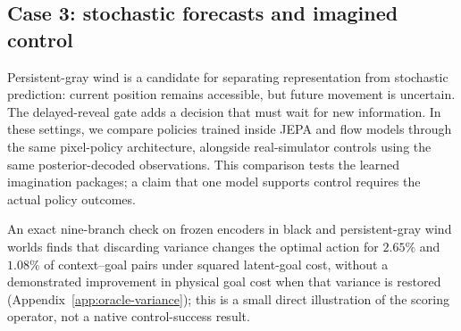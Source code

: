 \subsection{Case 3: stochastic forecasts and imagined control}
\label{sec:case-three}

Persistent-gray wind is a candidate for separating representation from stochastic prediction:
current position remains accessible, but future movement is uncertain. The delayed-reveal gate
adds a decision that must wait for new information. In these settings, we compare policies trained
inside JEPA and flow models through the same pixel-policy architecture, alongside real-simulator
controls using the same posterior-decoded observations. This comparison tests the learned
imagination packages; a claim that one model supports control requires the actual policy outcomes.


An exact nine-branch check on frozen encoders in black and persistent-gray wind worlds finds that
discarding variance changes the
optimal action for $2.65\%$ and $1.08\%$ of context--goal pairs under squared latent-goal cost,
without a demonstrated improvement in physical goal cost when that variance is restored
(Appendix~\ref{app:oracle-variance}); this is a small direct illustration of the scoring operator,
not a native control-success result.
